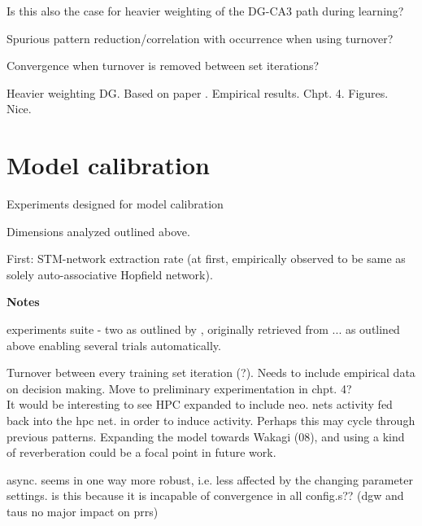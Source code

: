 Is this also the case for heavier weighting of the DG-CA3 path during learning?

Spurious pattern reduction/correlation with occurrence when using turnover?

Convergence when turnover is removed between set iterations?

Heavier weighting DG. Based on paper \citep{Norman2003}. Empirical results. Chpt. 4. Figures. Nice.

\section*{Model calibration}

Experiments designed for model calibration

Dimensions analyzed outlined above.

First: STM-network extraction rate (at first, empirically observed to be same as solely auto-associative Hopfield network).


\textbf{Notes}

experiments suite - two as outlined by \citep{Hattori2014}, originally retrieved from ... as outlined above
enabling several trials automatically.

Turnover between every training set iteration (?). Needs to include empirical data on decision making. Move to preliminary experimentation in chpt. 4?
\\

It would be interesting to see HPC expanded to include neo. nets activity fed back into the hpc net. in order to induce activity. Perhaps this may cycle through previous patterns. Expanding the model towards Wakagi (08), and using a kind of reverberation could be a focal point in future work.

async. seems in one way more robust, i.e. less affected by the changing parameter settings. is this because it is incapable of convergence in all config.s?? (dgw and taus no major impact on prrs)


\cleardoublepage